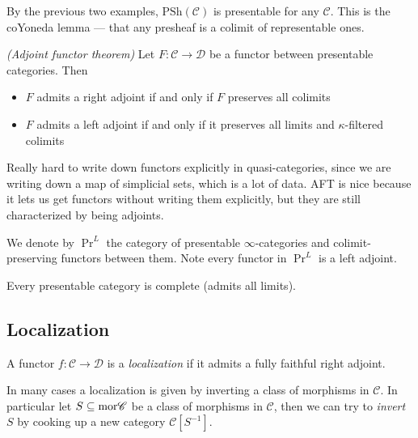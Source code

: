 \documentclass[11pt,openany]{book}
\renewcommand{\Pre}{\mathrm{PSh}}
\begin{document}
\begin{example}\label{ex:presheaves-presentable} By the previous two examples, $\Pre(\mathscr{C})$ is presentable for any $\mathscr{C}$. This is the coYoneda lemma --- that any presheaf is a colimit of representable ones.
\end{example}

\begin{theorem}\label{thm:aft} \textit{(Adjoint functor theorem)} Let $F \colon \mathscr{C} \to \mathscr{D}$ be a functor between presentable categories. Then
\begin{itemize}
    \item $F$ admits a right adjoint if and only if $F$ preserves all colimits
    \item $F$ admits a left adjoint if and only if it preserves all limits and $\kappa$-filtered colimits
\end{itemize}
\end{theorem}

Really hard to write down functors explicitly in quasi-categories, since we are writing down a map of simplicial sets, which is a lot of data. AFT is nice because it lets us get functors without writing them explicitly, but they are still characterized by being adjoints.

\begin{notation}\label{nota:PrL}  We denote by $\Pr^L$ the category of presentable $\infty$-categories and colimit-preserving functors between them. Note every functor in $\Pr^L$ is a left adjoint.
\end{notation}

\begin{theorem} Every presentable category is complete (admits all limits).
\end{theorem}


\subsection{Localization}

\begin{definition} \cite[5.2.7.2]{HTT} A functor $f \colon \mathscr{C}\to \mathscr{D}$ is a \textit{localization} if it admits a fully faithful right adjoint.
\end{definition}

In many cases a localization is given by inverting a class of morphisms in $\mathscr{C}$. In particular let $S \subseteq \mathrm{mor} \mathscr{C}$ be a class of morphisms in $\mathscr{C}$, then we can try to \textit{invert} $S$ by cooking up a new category $\mathscr{C}[S^{-1}]$.
\end{document}
